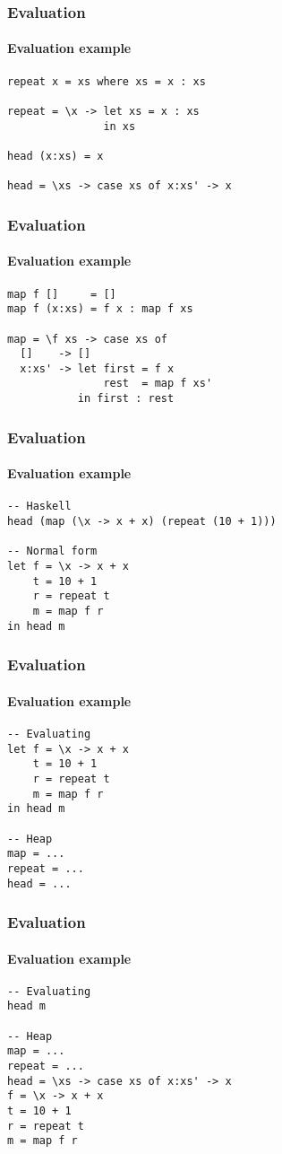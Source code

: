 \documentclass{beamer}
\begin{document}
\begin{frame}[fragile]
\frametitle{Evaluation}
\framesubtitle{Evaluation example}
\begin{verbatim}
repeat x = xs where xs = x : xs

repeat = \x -> let xs = x : xs
               in xs

head (x:xs) = x

head = \xs -> case xs of x:xs' -> x  
\end{verbatim}
\end{frame}

\begin{frame}[fragile]
\frametitle{Evaluation}
\framesubtitle{Evaluation example}
\begin{verbatim}
map f []     = []
map f (x:xs) = f x : map f xs

map = \f xs -> case xs of
  []    -> []   
  x:xs' -> let first = f x
               rest  = map f xs'
           in first : rest
\end{verbatim}
\end{frame}

\begin{frame}[t,fragile]
\frametitle{Evaluation}
\framesubtitle{Evaluation example}
\begin{verbatim}
-- Haskell
head (map (\x -> x + x) (repeat (10 + 1)))

-- Normal form
let f = \x -> x + x
    t = 10 + 1
    r = repeat t
    m = map f r
in head m
\end{verbatim}
\end{frame}

\begin{frame}[t,fragile]
\frametitle{Evaluation}
\framesubtitle{Evaluation example}
\begin{verbatim}
-- Evaluating
let f = \x -> x + x
    t = 10 + 1
    r = repeat t
    m = map f r
in head m

-- Heap
map = ...
repeat = ...
head = ...
\end{verbatim}
\end{frame}

\begin{frame}[t,fragile]
\frametitle{Evaluation}
\framesubtitle{Evaluation example}
\begin{verbatim}
-- Evaluating
head m

-- Heap
map = ...
repeat = ...
head = \xs -> case xs of x:xs' -> x
f = \x -> x + x
t = 10 + 1
r = repeat t
m = map f r
\end{verbatim}
\end{frame}
\end{document}

